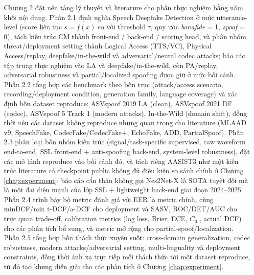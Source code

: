 Chương 2 đặt nền tảng lý thuyết và literature cho phần thực nghiệm bằng năm khối nội dung. Phần 2.1 định nghĩa Speech Deepfake Detection ở mức utterance-level (score liên tục $s = f(x)$ so với threshold $\tau$, quy ước \textit{bonafide} = 1, \textit{spoof} = 0), tách kiến trúc CM thành front-end / back-end / scoring head, và phân nhóm threat/deployment setting thành Logical Access (TTS/VC), Physical Access/replay, deepfake/in-the-wild và adversarial/neural codec attacks; báo cáo tập trung thực nghiệm vào LA và deepfake/in-the-wild, còn PA/replay, adversarial robustness và partial/localized spoofing được giữ ở mức bối cảnh. Phần 2.2 tổng hợp các benchmark theo bốn trục (attack/access scenario, recording/deployment condition, generation family, language coverage) và xác định bốn dataset reproduce: ASVspoof 2019 LA (clean), ASVspoof 2021 DF (codec), ASVspoof 5 Track 1 (modern attacks), In-the-Wild (domain shift), đồng thời nêu các dataset không reproduce nhưng quan trọng cho literature (MLAAD v9, SpeechFake, CodecFake/CodecFake+, EchoFake, ADD, PartialSpoof). Phần 2.3 phân loại bốn nhóm kiến trúc (signal/task-specific supervised, raw waveform end-to-end, SSL front-end + anti-spoofing back-end, system-level robustness), đặt các mô hình reproduce vào bối cảnh đó, và tách riêng AASIST3 như một kiến trúc literature có checkpoint public không đủ điều kiện so sánh chính ở Chương \ref{chap:experiment}; báo cáo cẩn thận không gọi Nes2Net-X là SOTA tuyệt đối mà là một đại diện mạnh của lớp SSL + lightweight back-end giai đoạn 2024--2025. Phần 2.4 trình bày bộ metric đánh giá với EER là metric chính, cùng minDCF/min t-DCF/a-DCF cho deployment và SASV, ROC/DET/AUC cho trực quan trade-off, calibration metrics (log loss, Brier, ECE, $C_{\mathrm{llr}}$, actual DCF) cho các phân tích bổ sung, và metric mở rộng cho partial-spoof/localization. Phần 2.5 tổng hợp bốn thách thức xuyên suốt: cross-domain generalization, codec robustness, modern attacks/adversarial setting, multi-linguality và deployment constraints, đồng thời ánh xạ trực tiếp mỗi thách thức tới một dataset reproduce, từ đó tạo khung diễn giải cho các phân tích ở Chương \ref{chap:experiment}.
